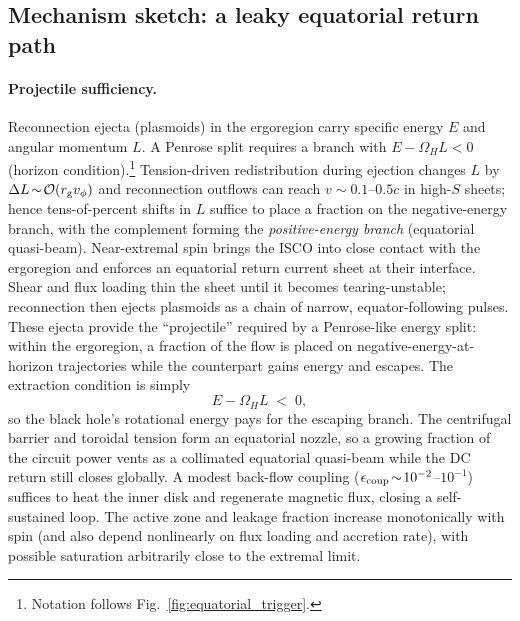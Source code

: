 \documentclass[twocolumn]{aastex701}
\begin{document}
\subsection{Mechanism sketch: a leaky equatorial return path}\label{sec:mech-sketch}
\paragraph{Projectile sufficiency.}
Reconnection ejecta (plasmoids) in the ergoregion carry specific energy $E$ and angular momentum $L$. A Penrose split requires a branch with $E-\Omega_H L<0$ (horizon condition).\footnote{Notation follows Fig.~\ref{fig:equatorial_trigger}.}
Tension-driven redistribution during ejection changes $L$ by $\Delta L\!\sim\!\mathcal{O}(r_{\rm g}v_\phi)$ and reconnection outflows can reach $v\!\sim\!0.1$–$0.5c$ in high-$S$ sheets; hence tens-of-percent shifts in $L$ suffice to place a fraction on the negative-energy branch, with the complement forming the \emph{positive-energy branch} (equatorial quasi-beam).
Near-extremal spin brings the ISCO into close contact with the ergoregion and enforces an equatorial return current sheet at their interface. Shear and flux loading thin the sheet until it becomes tearing-unstable; reconnection then ejects plasmoids as a chain of narrow, equator-following pulses. These ejecta provide the “projectile” required by a Penrose-like energy split: within the ergoregion, a fraction of the flow is placed on negative-energy-at-horizon trajectories while the counterpart gains energy and escapes. The extraction condition is simply
\begin{equation}
E - \Omega_H L \;<\; 0, \label{eq:penrose-cond}
\end{equation}
so the black hole’s rotational energy pays for the escaping branch. The centrifugal barrier and toroidal tension form an equatorial nozzle, so a growing fraction of the circuit power vents as a collimated equatorial quasi-beam while the DC return still closes globally. A modest back-flow coupling ($\epsilon_{\rm coup}\!\sim\!10^{-2}$–$10^{-1}$) suffices to heat the inner disk and regenerate magnetic flux, closing a self-sustained loop. The active zone and leakage fraction increase monotonically with spin (and also depend nonlinearly on flux loading and accretion rate), with possible saturation arbitrarily close to the extremal limit.
\end{document}

